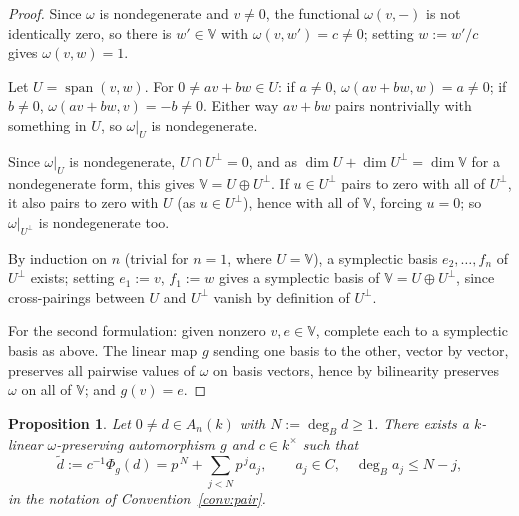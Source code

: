 \documentclass[11pt]{amsart}
\numberwithin{equation}{section}
\newtheorem{proposition}[theorem]{Proposition}
\theoremstyle{plain}
\theoremstyle{remark}
\begin{document}
\begin{proof}
Since $\omega$ is nondegenerate and $v\neq0$, the functional $\omega(v,-)$
is not identically zero, so there is $w'\in\mathbb V$ with
$\omega(v,w')=c\neq0$; setting $w:=w'/c$ gives $\omega(v,w)=1$.

Let $U=\operatorname{span}(v,w)$. For $0\neq av+bw\in U$: if $a\neq0$,
$\omega(av+bw,w)=a\neq0$; if $b\neq0$, $\omega(av+bw,v)=-b\neq0$. Either
way $av+bw$ pairs nontrivially with something in $U$, so $\omega|_U$ is
nondegenerate.

Since $\omega|_U$ is nondegenerate, $U\cap U^\perp=0$, and as
$\dim U+\dim U^\perp=\dim\mathbb V$ for a nondegenerate form, this gives
$\mathbb V=U\oplus U^\perp$. If $u\in U^\perp$ pairs to zero with all of
$U^\perp$, it also pairs to zero with $U$ (as $u\in U^\perp$), hence with
all of $\mathbb V$, forcing $u=0$; so $\omega|_{U^\perp}$ is nondegenerate
too.

By induction on $n$ (trivial for $n=1$, where $U=\mathbb V$), a
symplectic basis $e_2,\ldots,f_n$ of $U^\perp$ exists; setting $e_1:=v$,
$f_1:=w$ gives a symplectic basis of $\mathbb V=U\oplus U^\perp$, since
cross-pairings between $U$ and $U^\perp$ vanish by definition of
$U^\perp$.

For the second formulation: given nonzero $v,e\in\mathbb V$, complete
each to a symplectic basis as above. The linear map $g$ sending one basis
to the other, vector by vector, preserves all pairwise values of $\omega$
on basis vectors, hence by bilinearity preserves $\omega$ on all of
$\mathbb V$; and $g(v)=e$.
\end{proof}




\begin{proposition}\label{prop:monic}
Let $0\neq d\in A_n(k)$ with $N:=\deg_B d\ge1$. There exists a $k$-linear $\omega$-preserving automorphism $g$ and
$c\in k^{\times}$ such that
\begin{equation}
  \tilde d:=c^{-1}\Phi_g(d)=p^{\,N}+\sum_{j<N}p^{\,j}a_j,
  \qquad a_j\in C,\quad \deg_B a_j\le N-j,\label{eq:monic-d}
\end{equation}
in the notation of Convention~\ref{conv:pair}.
\end{proposition}
\end{document}
